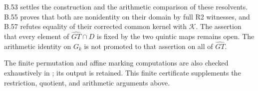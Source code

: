 B.53 settles the construction and the arithmetic comparison of
these resolvents. B.55 proves that both are nonidentity on
their domain by full R2 witnesses, and B.57 refutes equality
of their corrected common kernel with $\mathcal K$.
The assertion that every element of $\widehat{GT}\cap D$
is fixed by the two quintic maps remains open. The arithmetic
identity on $G_k$ is not promoted to that assertion on
all of $\widehat{GT}$.

The finite permutation and affine marking computations are also
checked exhaustively in ;
its output is retained. This finite certificate supplements the
restriction, quotient, and arithmetic arguments above.

